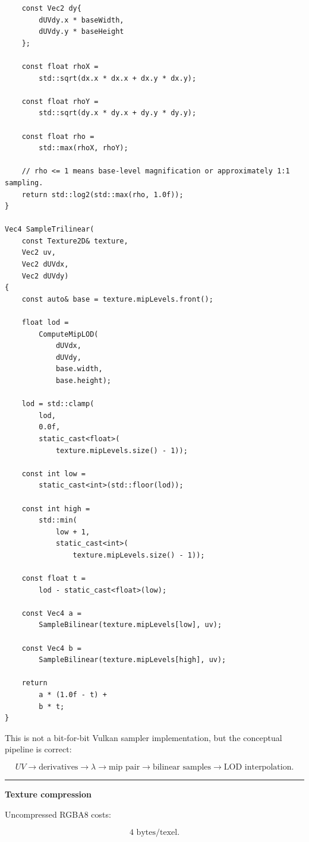 \begin{verbatim}
    const Vec2 dy{
        dUVdy.x * baseWidth,
        dUVdy.y * baseHeight
    };

    const float rhoX =
        std::sqrt(dx.x * dx.x + dx.y * dx.y);

    const float rhoY =
        std::sqrt(dy.x * dy.x + dy.y * dy.y);

    const float rho =
        std::max(rhoX, rhoY);

    // rho <= 1 means base-level magnification or approximately 1:1 sampling.
    return std::log2(std::max(rho, 1.0f));
}

Vec4 SampleTrilinear(
    const Texture2D& texture,
    Vec2 uv,
    Vec2 dUVdx,
    Vec2 dUVdy)
{
    const auto& base = texture.mipLevels.front();

    float lod =
        ComputeMipLOD(
            dUVdx,
            dUVdy,
            base.width,
            base.height);

    lod = std::clamp(
        lod,
        0.0f,
        static_cast<float>(
            texture.mipLevels.size() - 1));

    const int low =
        static_cast<int>(std::floor(lod));

    const int high =
        std::min(
            low + 1,
            static_cast<int>(
                texture.mipLevels.size() - 1));

    const float t =
        lod - static_cast<float>(low);

    const Vec4 a =
        SampleBilinear(texture.mipLevels[low], uv);

    const Vec4 b =
        SampleBilinear(texture.mipLevels[high], uv);

    return
        a * (1.0f - t) +
        b * t;
}
\end{verbatim}

This is not a bit-for-bit Vulkan sampler implementation, but the conceptual pipeline is correct:

\[
UV
\rightarrow
\text{derivatives}
\rightarrow
\lambda
\rightarrow
\text{mip pair}
\rightarrow
\text{bilinear samples}
\rightarrow
\text{LOD interpolation}.
\]

\begin{center}\rule{0.5\linewidth}{0.5pt}\end{center}

\textbf{Texture compression}

Uncompressed RGBA8 costs:

\[
4\text{ bytes/texel}.
\]


